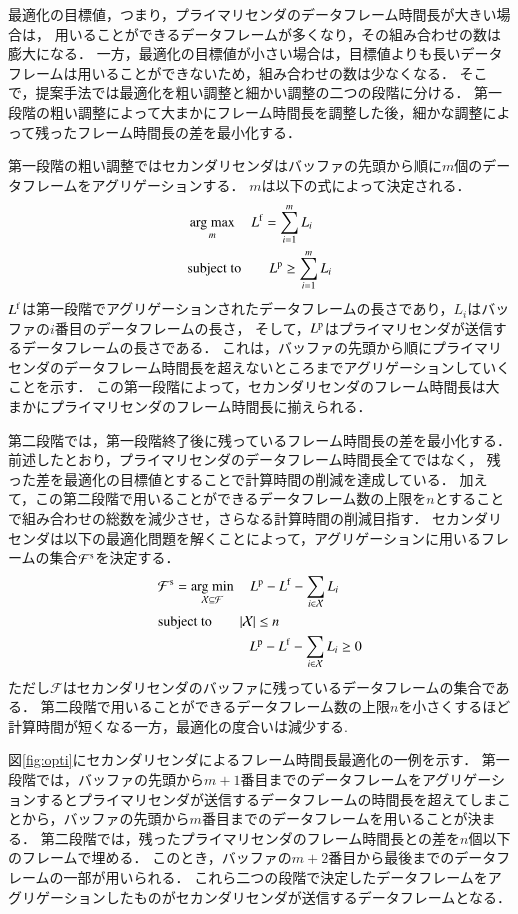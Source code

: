 \documentclass[master]{kuisthesis}		%
\newcommand{\argmax}{\mathop{\rm arg~max}\limits}
\newcommand{\argmin}{\mathop{\rm arg~min}\limits}
\begin{document}
		最適化の目標値，つまり，プライマリセンダのデータフレーム時間長が大きい場合は，
		用いることができるデータフレームが多くなり，その組み合わせの数は膨大になる．
		一方，最適化の目標値が小さい場合は，目標値よりも長いデータフレームは用いることができないため，組み合わせの数は少なくなる．
		そこで，提案手法では最適化を粗い調整と細かい調整の二つの段階に分ける．
		第一段階の粗い調整によって大まかにフレーム時間長を調整した後，細かな調整によって残ったフレーム時間長の差を最小化する．
		\par
		第一段階の粗い調整ではセカンダリセンダはバッファの先頭から順に$m$個のデータフレームをアグリゲーションする．
		$m$は以下の式によって決定される．
		\begin{align}
			&\argmax_m\quad L^{\rm f} = \sum_{i = 1}^{m} L_i \\
			&{\rm subject \ to} \qquad  L^{\rm p} \geq \sum_{i = 1}^{m} L_i
		\end{align}
		$L^{\rm f}$は第一段階でアグリゲーションされたデータフレームの長さであり，$L_i$はバッファの$i$番目のデータフレームの長さ，
		そして，$L^{\rm p}$はプライマリセンダが送信するデータフレームの長さである．
		これは，バッファの先頭から順にプライマリセンダのデータフレーム時間長を超えないところまでアグリゲーションしていくことを示す．
		この第一段階によって，セカンダリセンダのフレーム時間長は大まかにプライマリセンダのフレーム時間長に揃えられる．
		\par
		第二段階では，第一段階終了後に残っているフレーム時間長の差を最小化する．
		前述したとおり，プライマリセンダのデータフレーム時間長全てではなく，
		残った差を最適化の目標値とすることで計算時間の削減を達成している．
		加えて，この第二段階で用いることができるデータフレーム数の上限を$n$とすることで組み合わせの総数を減少させ，さらなる計算時間の削減目指す．
		セカンダリセンダは以下の最適化問題を解くことによって，アグリゲーションに用いるフレームの集合${\mathcal F}^{\rm s}$を決定する．
		\begin{align}
			&{\mathcal F}^{\rm s} = \argmin_{{\mathcal X} \subseteq {\mathcal F}}\quad L^{\rm p} - L^{\rm f} - \sum_{i \in {\mathcal X}}L_{i} \\
			&{\rm subject \ to} \qquad |{\mathcal X}| \leq n \\
			&\;\;\qquad\qquad\qquad L^{\rm p} - L^{\rm f} - \sum_{i \in {\mathcal X}} L_{i} \geq 0
		\end{align}
		ただし${\mathcal F}$はセカンダリセンダのバッファに残っているデータフレームの集合である．
		第二段階で用いることができるデータフレーム数の上限$n$を小さくするほど計算時間が短くなる一方，最適化の度合いは減少する.
		\par
		図\ref{fig:opti}にセカンダリセンダによるフレーム時間長最適化の一例を示す．
		第一段階では，バッファの先頭から$m+1$番目までのデータフレームをアグリゲーションするとプライマリセンダが送信するデータフレームの時間長を超えてしまことから，バッファの先頭から$m$番目までのデータフレームを用いることが決まる．
		第二段階では，残ったプライマリセンダのフレーム時間長との差を$n$個以下のフレームで埋める．
		このとき，バッファの$m+2$番目から最後までのデータフレームの一部が用いられる．
		これら二つの段階で決定したデータフレームをアグリゲーションしたものがセカンダリセンダが送信するデータフレームとなる．
		\par
\end{document}
